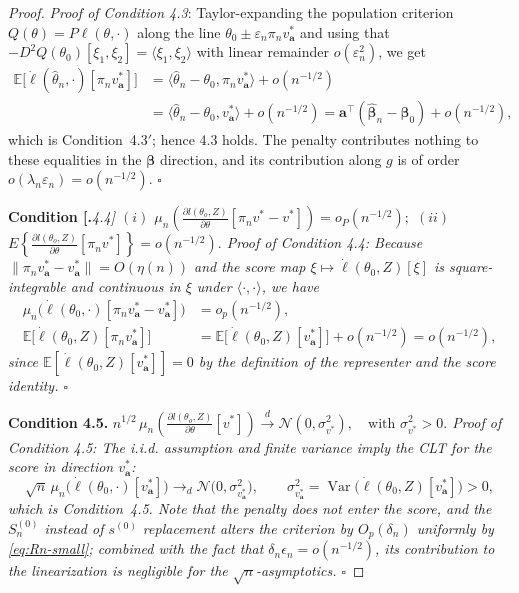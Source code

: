 \documentclass[11pt]{article}
\DeclareMathOperator{\Var}{Var}
\newcommand{\E}{\mathbb{E}}
\newenvironment{condition}[1]
  {\par\medskip\noindent\textbf{Condition #1.}\itshape}
  {\medskip}
\begin{document}
\begin{proof}
		\noindent\textit{Proof of Condition 4.3}: Taylor-expanding the population criterion $Q(\theta)=P\ell(\theta,\cdot)$ along the line $\theta_0\pm\varepsilon_n\pi_n v_{\bm a}^*$ and using that
		\(
		-D^2Q(\theta_0)[\xi_1,\xi_2]=\langle \xi_1,\xi_2\rangle
		\)
		with linear remainder $o(\varepsilon_n^2)$, we get
		\[
        \begin{aligned}
        \E\big[\dot\ell(\hat\theta_n,\cdot)[\pi_n v_{\bm a}^*]\big]
        &= \langle \hat\theta_n - \theta_0,\pi_n v_{\bm a}^* \rangle + o(n^{-1/2}) \\[3pt]
        &= \langle \hat\theta_n - \theta_0,v_{\bm a}^* \rangle + o(n^{-1/2})
        = \bm a^\top(\hat{\bm\beta}_n - \bm\beta_0) + o(n^{-1/2}),
        \end{aligned}
        \]
        which is Condition~4.3$'$; hence 4.3 holds. The penalty contributes nothing to these equalities in the $\bm\beta$ direction, and its contribution along $g$ is of order  $o(\lambda_n\varepsilon_n)=o(n^{-1/2})$. \hfill $\square$
        		
		\begin{condition}[4.4] $(i)$ $\mu_n \left( \frac{\partial l(\theta_o, Z)}{\partial \theta} [\pi_n v^* - v^*] \right) = o_P(n^{-1/2});$ $(ii)$ $E \left\{ \frac{\partial l(\theta_o, Z)}{\partial \theta} [\pi_n v^*] \right\} = o(n^{-1/2}).$
        \end{condition}
		\noindent\textit{Proof of Condition 4.4}:	Because $\|\pi_n v_{\bm a}^*-v_{\bm a}^*\|=O(\eta(n))$ and the score map $\xi\mapsto \dot\ell(\theta_0,Z)[\xi]$ is square-integrable and continuous in $\xi$ under $\langle\cdot,\cdot\rangle$, we have
		\begin{align*}
		\mu_n\!\Big(\dot\ell(\theta_0,\cdot)[\pi_n v_{\bm a}^*-v_{\bm a}^*]\Big)&=o_p(n^{-1/2}),\\
		\E\!\Big[\dot\ell(\theta_0,Z)[\pi_n v_{\bm a}^*]\Big]
		&=\E\!\Big[\dot\ell(\theta_0,Z)[v_{\bm a}^*]\Big]+o(n^{-1/2})=o(n^{-1/2}),
		\end{align*}
		since $\E[\dot\ell(\theta_0,Z)[v_{\bm a}^*]]=0$ by the definition of the representer and the score identity. \hfill $\square$
		
		\begin{condition}{4.5}
		\(
		n^{1/2} \, \mu_n \left( \frac{\partial l(\theta_o, Z)}{\partial \theta} [v^*] \right) 
		\overset{d}{\to} \mathcal{N}(0, \sigma_{v^*}^2), \quad \text{with } \sigma_{v^*}^2 > 0.
		\)
        \end{condition}
		\noindent \textit{Proof of Condition 4.5}: The i.i.d. assumption and finite variance imply the CLT for the score in direction $v_{\bm a}^*$:
		\[
		\sqrt n\,\mu_n\!\Big(\dot\ell(\theta_0,\cdot)[v_{\bm a}^*]\Big)
		\to_d\mathcal N\!\big(0,\sigma^2_{v_{\bm a}^*}\big),
		\qquad
		\sigma^2_{v_{\bm a}^*}=\Var\!\Big(\dot\ell(\theta_0,Z)[v_{\bm a}^*]\Big)>0,
		\]
		which is Condition~4.5. Note that the penalty does not enter the score, and the $S_n^{(0)}$ instead of $s^{(0)}$ replacement alters the criterion by 
		$O_p(\delta_n)$ uniformly by \eqref{eq:Rn-small}; combined with the fact that $\delta_n\epsilon_n = o(n^{-1/2})$, its contribution to the linearization is negligible for the $\sqrt n$-asymptotics. \hfill $\square$
	\end{proof}
	
\end{document}

